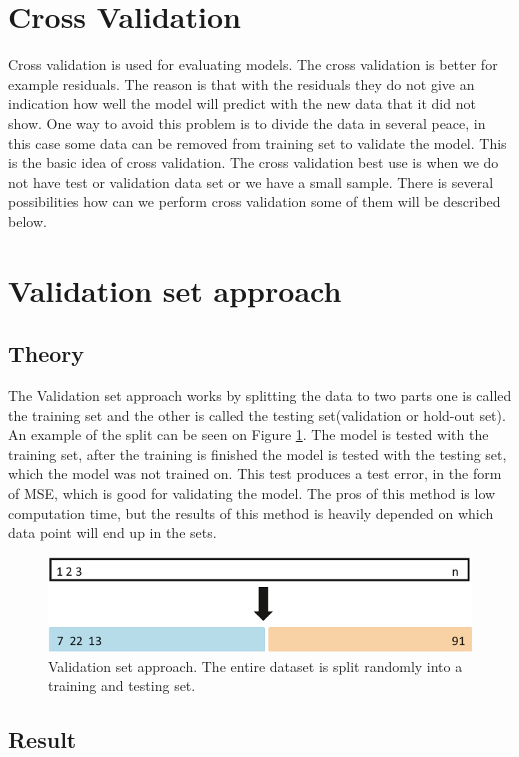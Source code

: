 \section{Cross Validation} \label{sc:crossValidation}
Cross validation is used for evaluating models. The cross validation is better for example residuals. The reason is that with the residuals they do not give an indication how well the model will predict with the new data that it did not show. One way to avoid this problem is to divide the data in several peace, in this case some data can be removed from training set to validate the model. This is the basic idea of cross validation. The cross validation best use is when we do not have test or validation data set or we have a small sample. There is several possibilities how can we perform cross validation some of them will be described below.

\section{Validation set approach}
\subsection{Theory}
The Validation set approach works by splitting the data to two parts one is called the training set and the other is called the testing set(validation or hold-out set). An example of the split can be seen on Figure \ref{fig:validationsetapproach}. The model is tested with the training set, after the training is finished the model is tested with the testing set, which the model was not trained on. This test produces a test error, in the form of MSE, which is good for validating the model. The pros of this method is low computation time, but the results of this method is heavily depended on which data point will end up in the sets. 
\begin{figure}
	\centering
	\includegraphics[width=0.4\linewidth]{crossValidation/validationSetApproach}
	\caption{Validation set approach. The entire dataset is split randomly into a training and testing set.}
	\label{fig:validationsetapproach}
\end{figure}

\subsection{Result}
